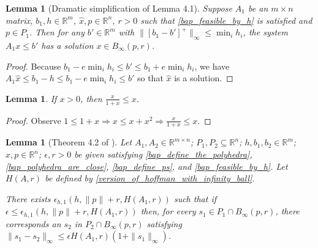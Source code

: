\documentclass{article}
\newtheorem{lemma}[theorem]{Lemma}
\theoremstyle{case}
\numberwithin{theorem}{subsection}
\newcommand{\bpr}{{B_{\infty}\left(p, r\right)}}
\newcommand{\Rm}{\mathbb R^m}
\newcommand{\Rn}{\mathbb R^n}
\begin{document}
\begin{lemma}[Dramatic simplification of Lemma 4.1]
\label{4_1}
Suppose $A_1$ be an $m \times n$ matrix, $b_1, h \in \Rm$, $\hat x, p \in \Rn$, $r>0$ such that 
\cref{bap_feasible_by_h} is satisfied and $p \in P_1$.
Then for any $b' \in \Rm$ with $\|\left[b_1 - b'\right]^+\|_{\infty} \le \min_i h_i$, 
the system $A_1x \le b'$ has a solution $x \in \bpr$.
\end{lemma}

\begin{proof}
Because $b_1 - e \min_i h_i \le b' \le b_1 + e \min_i h_i$, we have $A_1\hat x\le b_1 - h\le b_1 - e \min_i h_i \le b'$ so that $\hat x$ is a solution.
\end{proof}


\begin{lemma}
\label{simple_bound}
If $x > 0$, then $\frac {x}{1+x} \le x$.
\end{lemma}
\begin{proof}
Observe $1 \le 1 + x\Longrightarrow x \le x + x^2 \Longrightarrow \frac {x}{1+x} \le x$.
\end{proof}


\begin{lemma}[Theorem 4.2 of \cite{perturbations_of_linear_inequalities}]
\label{4_2}
Let 
$A_1, A_2 \in \mathbb R ^ {m \times n}$;
$P_1, P_2 \subseteq \Rn$;
$h, b_1, b_2 \in \Rm$;
$\hat x, p \in \Rn$;
$\epsilon, r > 0$
be given satisfying
\cref{bap_define_the_polyhedra}, \cref{bap_polyhedra_are_close}, \cref{bap_define_ps}, and \cref{bap_feasible_by_h}.
Let $H\left(A, r\right)$ be defined by \cref{version_of_hoffman_with_infinity_ball}.


There exists $\epsilon_{h, 1}\left(h, \|p\| + r, H\left(A_1, r\right)\right)$ such that if 
$\epsilon \le \epsilon_{h, 1}\left(h, \|p\| + r, H\left(A_1, r\right)\right)$
then, for every $s_1 \in P_1 \cap \bpr$,
there corresponds an $s_2$ in $P_2 \cap \bpr$ satisfying 
$\|s_1 - s_2\|_{\infty}\le \epsilon H\left(A_1, r\right)\left(1 + \|s_1\|_{\infty}\right)$.
\end{lemma}
\end{document}
